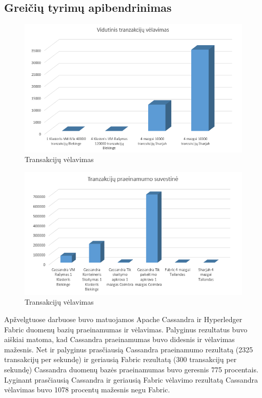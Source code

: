 \documentclass{VUMIFPSkursinis}
\begin{document}
\subsection{Greičių tyrimų apibendrinimas}
\begin{figure}[H]
\centering
\includegraphics[scale=0.5]{img/CasHypLat}
\caption{Transakcijų vėlavimas} %
\label{img:mlp}
\end{figure}
\begin{figure}[H]
\centering
\includegraphics[scale=0.5]{img/CasHypTp}
\caption{Transakcijų vėlavimas} %
\label{img:mlp}
\end{figure}

Apžvelgtuose darbuose buvo matuojamos Apache Cassandra ir Hyperledger Fabric duomenų bazių praeinamumas ir vėlavimas.
Palyginus rezultatus buvo aiškiai matoma, kad Cassandra praeinamumas buvo didesnis ir vėlavimas mažesnis. 
Net ir palyginus prasčiausią Cassandra praeinamumo rezultatą (2325 transakcijų per sekundę) ir geriausią Fabric rezultatą (300 transakcijų per sekundę) Cassandra duomenų bazės praeinamumas buvo geresnis 775 procentais. Lyginant prasčiausią Cassandra ir geriausią Fabric vėlavimo rezultatą Cassandra vėlavimas buvo 1078 procentų mažesnis negu Fabric.
\pagebreak
\end{document}
